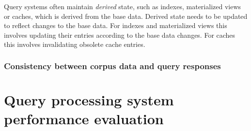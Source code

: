 





Query systems often maintain \textit{derived} state, such as indexes, materialized views or caches, which is
derived from the base data.
Derived state needs to be updated to reflect changes to the base data.
For indexes and materialized views this involves updating their entries according to the base data changes.
For caches this involves invalidating obsolete cache entries.


\subsubsection{Consistency between corpus data and query responses}

\section{Query processing system performance evaluation}
\label{sec:requirements}

